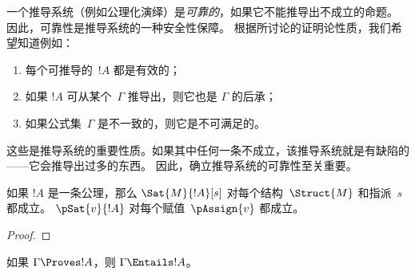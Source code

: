 \documentclass[../../../include/open-logic-section]{subfiles}
\begin{document}
      {}
      {}


\begin{explain}
一个推导系统（例如公理化演绎）是\emph{可靠的}，如果它不能推导出不成立的命题。
因此，可靠性是推导系统的一种安全性保障。
根据所讨论的证明论性质，我们希望知道例如：
\begin{enumerate}
\item 每个可推导的~$!A$ 都是有效的；
\item 如果 $!A$ 可从某个~$\Gamma$ 推导出，则它也是 $\Gamma$ 的后承；
\item 如果公式集~$\Gamma$ 是不一致的，则它是不可满足的。
\end{enumerate}
这些是推导系统的重要性质。如果其中任何一条不成立，该推导系统就是有缺陷的——它会推导出过多的东西。
因此，确立推导系统的可靠性至关重要。
\end{explain}

\begin{prop}
  如果 $!A$ 是一条公理，那么
    {$\Sat{M}{!A}[s]$ 对每个结构~$\Struct{M}$ 和指派~$s$ 都成立。}
    {$\pSat{v}{!A}$ 对每个赋值~$\pAssign{v}$ 都成立。}
\end{prop}

\begin{proof}
\end{proof}

\begin{thm}[可靠性]
如果 $\Gamma \Proves !A$，则 $\Gamma \Entails !A$。
\end{thm}
\end{document}
